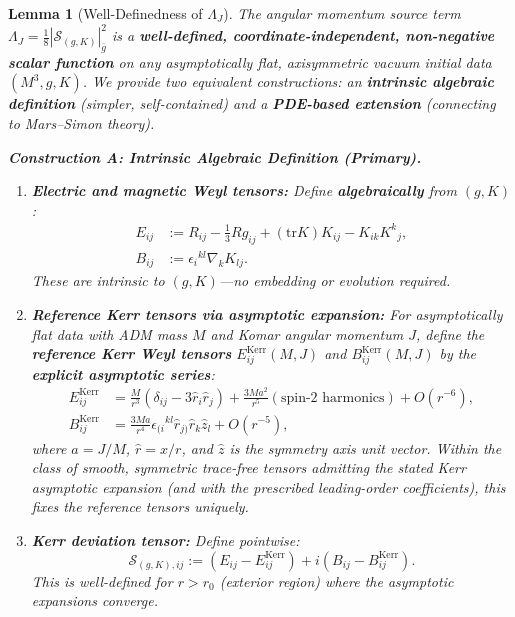 \documentclass[12pt]{article}
\theoremstyle{plain}
\newtheorem{lemma}[theorem]{Lemma}
\theoremstyle{definition}
\theoremstyle{remark}
\newcommand{\tr}{\mathrm{tr}}
\newcommand{\bg}{\bar{g}}
\begin{document}
\begin{lemma}[Well-Definedness of $\Lambda_J$]\label{lem:Lambda-J-welldef}
The angular momentum source term $\Lambda_J = \frac{1}{8}|\mathcal{S}_{(g,K)}|^2_{\bg}$ is a \textbf{well-defined, coordinate-independent, non-negative scalar function} on any asymptotically flat, axisymmetric vacuum initial data $(M^3, g, K)$. We provide two equivalent constructions: an \textbf{intrinsic algebraic definition} (simpler, self-contained) and a \textbf{PDE-based extension} (connecting to Mars--Simon theory).

\textbf{Construction A: Intrinsic Algebraic Definition (Primary).}
\begin{enumerate}[label=\textup{(\roman*)}]
    \item \textbf{Electric and magnetic Weyl tensors:} Define \textbf{algebraically} from $(g, K)$:
    \begin{align*}
    E_{ij} &:= R_{ij} - \tfrac{1}{3}Rg_{ij} + (\tr K)K_{ij} - K_{ik}K^k{}_j, \\
    B_{ij} &:= \epsilon_i{}^{kl}\nabla_k K_{lj}.
    \end{align*}
    These are intrinsic to $(g, K)$---no embedding or evolution required.
    
    \item \textbf{Reference Kerr tensors via asymptotic expansion:} For asymptotically flat data with ADM mass $M$ and Komar angular momentum $J$, define the \textbf{reference Kerr Weyl tensors} $E^{\mathrm{Kerr}}_{ij}(M,J)$ and $B^{\mathrm{Kerr}}_{ij}(M,J)$ by the \textbf{explicit asymptotic series}:
    \begin{align*}
    E^{\mathrm{Kerr}}_{ij} &= \frac{M}{r^3}\left(\delta_{ij} - 3\hat{r}_i\hat{r}_j\right) + \frac{3Ma^2}{r^5}\left(\text{spin-2 harmonics}\right) + O(r^{-6}), \\
    B^{\mathrm{Kerr}}_{ij} &= \frac{3Ma}{r^4}\epsilon_{(i}{}^{kl}\hat{r}_{j)}\hat{r}_k \hat{z}_l + O(r^{-5}),
    \end{align*}
    where $a = J/M$, $\hat{r} = x/r$, and $\hat{z}$ is the symmetry axis unit vector. Within the class of smooth, symmetric trace-free tensors admitting the stated Kerr asymptotic expansion (and with the prescribed leading-order coefficients), this fixes the reference tensors uniquely.
    
    \item \textbf{Kerr deviation tensor:} Define pointwise:
    \[
    \mathcal{S}_{(g,K),ij} := (E_{ij} - E^{\mathrm{Kerr}}_{ij}) + i(B_{ij} - B^{\mathrm{Kerr}}_{ij}).
    \]
    This is well-defined for $r > r_0$ (exterior region) where the asymptotic expansions converge.
    

\end{enumerate}
\end{lemma}
\end{document}
